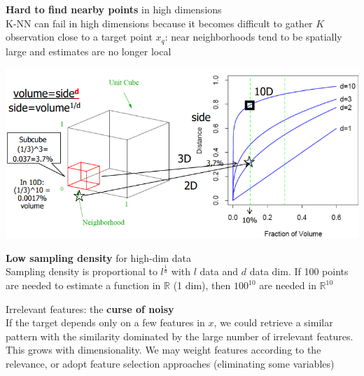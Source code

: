 \documentclass[10pt]{report}
\begin{document}
\begin{list}{}{}
	\item \textbf{Hard to find nearby points} in high dimensions\\
	K-NN can fail in high dimensions because it becomes difficult to gather $K$ observation close to a target point $x_q$: near neighborhoods tend to be spatially large and estimates are no longer local
	\begin{center}
		\includegraphics[scale=0.75]{5.png}
	\end{center}
	\item \textbf{Low sampling density} for high-dim data\\
	Sampling density is proportional to $l^{\frac{1}{d}}$ with $l$ data and $d$ data dim. If 100 points are needed to estimate a function in $\mathbb{R}$ (1 dim), then $100^{10}$ are needed in $\mathbb{R}^{10}$
	\item Irrelevant features: the \textbf{curse of noisy}\\
	If the target depends only on a few features in $x$, we could retrieve a similar pattern with the similarity dominated by the large number of irrelevant features. This grows with dimensionality. We may weight features according to the relevance, or adopt feature selection approaches (eliminating some variables)
\end{list}
\pagebreak
\end{document}

